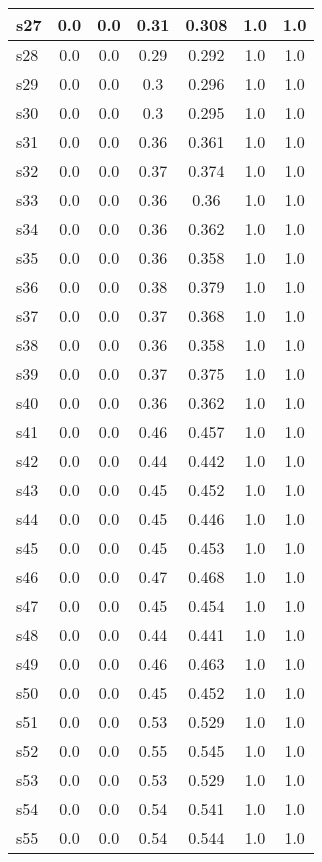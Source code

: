 \documentclass{article}
\begin{document}
\begin{tabular}{|l|c|c|c|c|c|c|}
s27 &0.0 & 0.0 & 0.31 & 0.308 & 1.0 & 1.0\\
\hline
s28 &0.0 & 0.0 & 0.29 & 0.292 & 1.0 & 1.0\\
\hline
s29 &0.0 & 0.0 & 0.3 & 0.296 & 1.0 & 1.0\\
\hline
s30 &0.0 & 0.0 & 0.3 & 0.295 & 1.0 & 1.0\\
\hline
s31 &0.0 & 0.0 & 0.36 & 0.361 & 1.0 & 1.0\\
\hline
s32 &0.0 & 0.0 & 0.37 & 0.374 & 1.0 & 1.0\\
\hline
s33 &0.0 & 0.0 & 0.36 & 0.36 & 1.0 & 1.0\\
\hline
s34 &0.0 & 0.0 & 0.36 & 0.362 & 1.0 & 1.0\\
\hline
s35 &0.0 & 0.0 & 0.36 & 0.358 & 1.0 & 1.0\\
\hline
s36 &0.0 & 0.0 & 0.38 & 0.379 & 1.0 & 1.0\\
\hline
s37 &0.0 & 0.0 & 0.37 & 0.368 & 1.0 & 1.0\\
\hline
s38 &0.0 & 0.0 & 0.36 & 0.358 & 1.0 & 1.0\\
\hline
s39 &0.0 & 0.0 & 0.37 & 0.375 & 1.0 & 1.0\\
\hline
s40 &0.0 & 0.0 & 0.36 & 0.362 & 1.0 & 1.0\\
\hline
s41 &0.0 & 0.0 & 0.46 & 0.457 & 1.0 & 1.0\\
\hline
s42 &0.0 & 0.0 & 0.44 & 0.442 & 1.0 & 1.0\\
\hline
s43 &0.0 & 0.0 & 0.45 & 0.452 & 1.0 & 1.0\\
\hline
s44 &0.0 & 0.0 & 0.45 & 0.446 & 1.0 & 1.0\\
\hline
s45 &0.0 & 0.0 & 0.45 & 0.453 & 1.0 & 1.0\\
\hline
s46 &0.0 & 0.0 & 0.47 & 0.468 & 1.0 & 1.0\\
\hline
s47 &0.0 & 0.0 & 0.45 & 0.454 & 1.0 & 1.0\\
\hline
s48 &0.0 & 0.0 & 0.44 & 0.441 & 1.0 & 1.0\\
\hline
s49 &0.0 & 0.0 & 0.46 & 0.463 & 1.0 & 1.0\\
\hline
s50 &0.0 & 0.0 & 0.45 & 0.452 & 1.0 & 1.0\\
\hline
s51 &0.0 & 0.0 & 0.53 & 0.529 & 1.0 & 1.0\\
\hline
s52 &0.0 & 0.0 & 0.55 & 0.545 & 1.0 & 1.0\\
\hline
s53 &0.0 & 0.0 & 0.53 & 0.529 & 1.0 & 1.0\\
\hline
s54 &0.0 & 0.0 & 0.54 & 0.541 & 1.0 & 1.0\\
\hline
s55 &0.0 & 0.0 & 0.54 & 0.544 & 1.0 & 1.0\\

\end{tabular}
\end{document}
